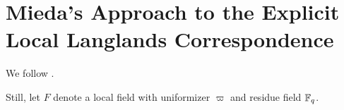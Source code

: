 \documentclass[../main.tex]{subfiles}
\begin{document}
\section{Mieda's Approach to the Explicit Local Langlands Correspondence} %
\label{sec:Mieda's Approach to the Explicit Local Langlands Correspondence}
We follow \cite{mieda2016geometric}.

Still, let $F$ denote a local field with uniformizer $\varpi$ and residue field 
$\mathbb{F}_q$. 


\end{document}
